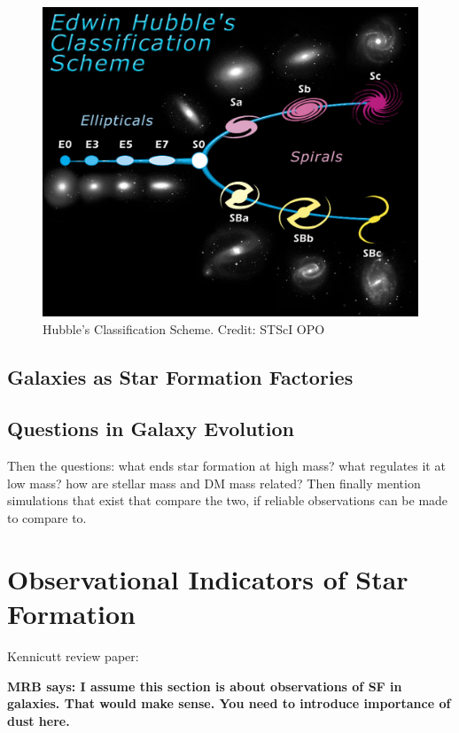 \begin{figure}
\includegraphics[width=\textwidth]{figures/hubble}
\caption[Hubble's Classification Scheme for galaxy morphologies]
{ Hubble's Classification Scheme. Credit: STScI OPO
\label{fig:hubble_classification}}
\end{figure}

\subsection{Galaxies as Star Formation Factories}




\subsection{Questions in Galaxy Evolution}
{Then the questions: what ends star formation at high mass?
what  regulates it at low mass? how are 
stellar mass and DM mass related? Then finally mention
simulations that exist that compare the two, if reliable
observations can be made to compare to.}

\section{Observational Indicators of Star Formation}

Kennicutt review paper: 

{\bf MRB says: I assume this section is about observations 
of SF in galaxies. That would make sense. You need to 
introduce importance of dust here.}

